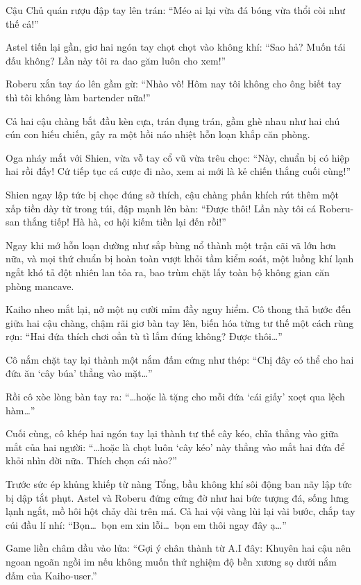 \documentclass[../main.tex]{subfiles}
\begin{document}
Cậu Chủ quán rượu đập tay lên trán: ``Méo ai lại vừa đá bóng vừa thổi còi như thế cả!''

Astel tiến lại gần, giơ hai ngón tay chọt chọt vào không khí: ``Sao hả? Muốn tái đấu không? Lần này tôi ra dao găm luôn cho xem!''

Roberu xắn tay áo lên gầm gừ: ``Nhào vô! Hôm nay tôi không cho ông biết tay thì tôi không làm bartender nữa!''

Cả hai cậu chàng bắt đầu kèn cựa, trán đụng trán, gầm ghè nhau như hai chú cún con hiếu chiến, gây ra một hồi náo nhiệt hỗn loạn khắp căn phòng.

Oga nháy mắt với Shien, vừa vỗ tay cổ vũ vừa trêu chọc: ``Này, chuẩn bị có hiệp hai rồi đấy! Cứ tiếp tục cá cược đi nào, xem ai mới là kẻ chiến thắng cuối cùng!''

Shien ngay lập tức bị chọc đúng sở thích, cậu chàng phấn khích rút thêm một xấp tiền dày từ trong túi, đập mạnh lên bàn: ``Được thôi! Lần này tôi cá Roberu-san thắng tiếp! Hà hà, cơ hội kiếm tiền lại đến rồi!''

Ngay khi mớ hỗn loạn dường như sắp bùng nổ thành một trận cãi vã lớn hơn nữa, và mọi thứ chuẩn bị hoàn toàn vượt khỏi tầm kiểm soát, một luồng khí lạnh ngắt khó tả đột nhiên lan tỏa ra, bao trùm chặt lấy toàn bộ không gian căn phòng mancave.

Kaiho nheo mắt lại, nở một nụ cười mỉm đầy nguy hiểm. Cô thong thả bước đến giữa hai cậu chàng, chậm rãi giơ bàn tay lên, biến hóa từng tư thế một cách rùng rợn: ``Hai đứa thích chơi oẳn tù tì lắm đúng không? Được thôi\dots''

Cô nắm chặt tay lại thành một nắm đấm cứng như thép: ``Chị đây có thể cho hai đứa ăn `cây búa' thẳng vào mặt\dots''

Rồi cô xòe lòng bàn tay ra: ``\dots hoặc là tặng cho mỗi đứa `cái giấy' xoẹt qua lệch hàm\dots''

Cuối cùng, cô khép hai ngón tay lại thành tư thế cây kéo, chĩa thẳng vào giữa mắt của hai người: ``\dots hoặc là chọt luôn `cây kéo' này thẳng vào mắt hai đứa để khỏi nhìn đời nữa. Thích chọn cái nào?''

Trước sức ép khủng khiếp từ nàng Tổng, bầu không khí sôi động ban nãy lập tức bị dập tắt phụt. Astel và Roberu đứng cứng đờ như hai bức tượng đá, sống lưng lạnh ngắt, mồ hôi hột chảy dài trên má. Cả hai vội vàng lùi lại vài bước, chắp tay cúi đầu lí nhí: ``Bọn\dots\ bọn em xin lỗi\dots\ bọn em thôi ngay đây ạ\dots''

Game liền châm dầu vào lửa: ``Gợi ý chân thành từ A.I đây: Khuyên hai cậu nên ngoan ngoãn ngồi im nếu không muốn thử nghiệm độ bền xương sọ dưới nắm đấm của Kaiho-user.''
\end{document}
